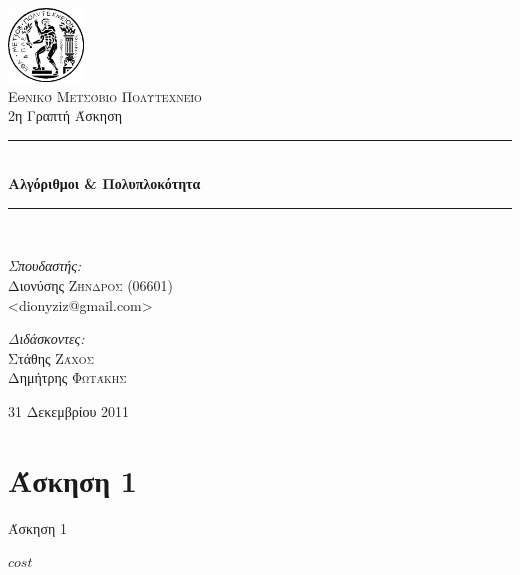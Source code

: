 \documentclass[11pt,a4paper]{book}
\newcommand{\HRule}{\rule{\linewidth}{0.5mm}}
\begin{document}
\begin{titlepage}
\begin{center}

\includegraphics[width=0.15\textwidth]{Pyrforos3.png}\\[1cm]
\textsc{\LARGE Εθνικό Μετσόβιο Πολυτεχνείο}\\[1.5cm]

\Large{ 2η Γραπτή Άσκηση }\\[0.5cm]

\begin{doublespace}
\HRule \\[0.4cm]
{\huge \bfseries
Αλγόριθμοι \& Πολυπλοκότητα
}\\[0.4cm]
\end{doublespace}

\HRule \\[1.5cm]

\begin{minipage}{0.4\textwidth}
\begin{flushleft} \large
\emph{Σπουδαστής:} \\
Διονύσης \textsc{Ζήνδρος} (06601)\\
\textlatin{\textless dionyziz@gmail.com\textgreater}
\end{flushleft}
\end{minipage}
\begin{minipage}{0.4\textwidth}
\begin{flushright} \large
\emph{Διδάσκοντες:} \\
Στάθης \textsc{Ζάχος}\\
Δημήτρης \textsc{Φωτάκης}
\end{flushright}
\end{minipage}

\vfill

{\large 31 Δεκεμβρίου 2011}
\end{center}
\end{titlepage}

\section*{Άσκηση 1}

\begin{algorithm}[H]
\caption{\textgreek{Άσκηση 1}}
\begin{algorithmic}[1]
	\State \Return $cost$
\EndProcedure
\end{algorithmic}
\end{algorithm}
\end{document}

